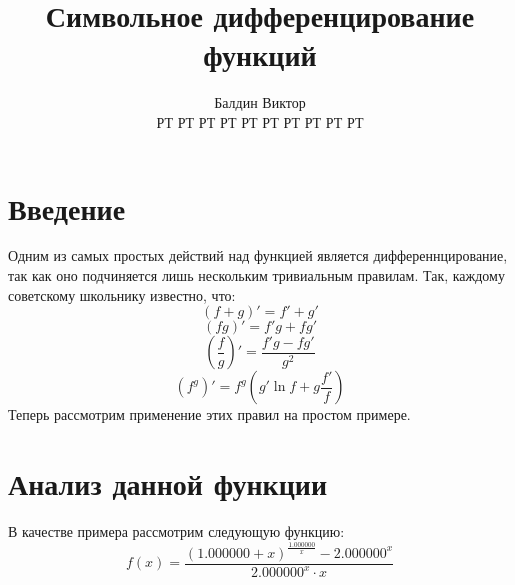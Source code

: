 \documentclass{article}
\title{Символьное дифференцирование функций}
\author{Балдин Виктор\\РТ РТ РТ РТ РТ РТ РТ РТ РТ РТ}
\begin{document}
\maketitle
\section{Введение}
Одним из самых простых действий над функцией является дифференнцирование, так как оно подчиняется лишь нескольким тривиальным правилам. Так, каждому советскому школьнику известно, что:
$$(f+g)'=f'+g'$$
$$(fg)' =f'g+fg'$$
$$\left(\frac{f}{g}\right)'=\frac{f'g-fg'}{g^2}$$
$$(f^g)'=f^g\left(g'\ln f+g\frac{f'}{f}\right)$$Теперь рассмотрим применение этих правил на простом примере.\section{Анализ данной функции}
В качестве примера рассмотрим следующую функцию:
$$f(x)=\frac{\left(1.000000+x\right)^{\frac{1.000000}{x}}-2.000000^{x}}{2.000000^{x} \cdot x}$$
\end{document}
